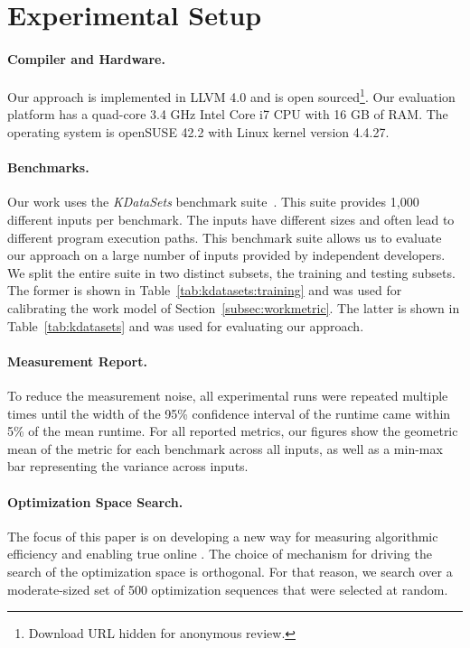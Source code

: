 \section{Experimental Setup}\label{sec:setup}

\paragraph{Compiler and Hardware.}
Our approach is implemented in LLVM 4.0 and is open sourced\footnote{Download URL hidden for anonymous review.}. Our evaluation platform has
a quad-core 3.4 GHz Intel Core i7 CPU with 16 GB of RAM. The operating system is openSUSE 42.2 with Linux kernel version 4.4.27.

\paragraph{Benchmarks.}
Our work uses the \textit{KDataSets} benchmark suite~\cite{chen10,chen12a}. This suite provides 1,000 different inputs per benchmark. The
inputs have different sizes and often lead to different program execution paths. This benchmark suite allows us to evaluate our approach on
a large number of inputs provided by independent developers. We split the entire suite in two distinct subsets, the training and testing
subsets. The former is shown in Table~\ref{tab:kdatasets:training} and was used for calibrating the work model of
Section~\ref{subsec:workmetric}. The latter is shown in Table~\ref{tab:kdatasets} and was used for evaluating our approach.



\paragraph{Measurement Report.}
To reduce the measurement noise, all experimental runs were repeated multiple times until the width of the 95\% confidence interval of the
runtime came within 5\% of the mean runtime. For all reported metrics, our figures show the geometric mean of the metric for each benchmark
across all inputs, as well as a min-max bar representing the variance across inputs.

\paragraph{Optimization Space Search.}

The focus of this paper is on developing a new way for measuring algorithmic efficiency and enabling true online {\itercomp}. The choice of
mechanism for driving the search of the optimization space is orthogonal. For that reason, we search over a moderate-sized set of 500
optimization sequences that were selected at random.

